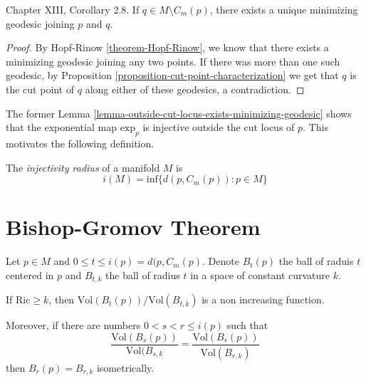 \begin{lemma}
\label{lemma-outside-cut-locus-exists-minimizing-geodesic}
\cite{doc} Chapter XIII, Corollary 2.8. If $q \in M\setminus C_m(p)$, there exists a
 unique minimizing geodesic joining
$p$ and $q$.
\end{lemma}

\begin{proof}
By Hopf-Rinow \ref{theorem-Hopf-Rinow}, we know that
there exists a minimizing geodesic joining any two points. If there was more
than one such geodesic, by 
Proposition \ref{proposition-cut-point-characterization} 
we get that $q$ is the cut point of  $q$ along either of these geodesics, 
a contradiction.
\end{proof}

The former Lemma \ref{lemma-outside-cut-locus-exists-minimizing-geodesic} 
shows that the exponential map $\text{exp}_p$
 is injective outside the cut locus of $p$. 
This motivates the following definition.

\begin{definition}
\label{definition-injectivity-radius}
The {\it injectivity radius} of a manifold $M$ is
$$
i(M)=\text{inf}\{d(p,C_m(p)):p \in M\}
$$
\end{definition}

\section{Bishop-Gromov Theorem}
\label{section-bishop-gromov}

\begin{theorem}
\label{theorem-Bishop-Gromov}
Let $p \in M$ and $0\leq t \leq i(p)=d(p,C_m(p)$. Denote $B_t(p)$ the ball of
raduis $t$ centered in $p$ and $B_{t,k}$ the ball of radius $t$ in a space of
constant curvature $k$.

If $\text{Ric}\geq k$, then $\text{Vol}(B_t(p))/\text{Vol}(B_{t,k})$ is a non
increasing function.

Moreover, if there are numbers  $0<s<r\leq i(p)$ such that
$$
\frac{\text{Vol}(B_s(p))}{\text{Vol}(B_{s,k}}=
\frac{\text{Vol}(B_r(p))}{\text{Vol}(B_{r,k})}
$$
then $B_r(p)=B_{r,k}$ isometrically.
\end{theorem}

